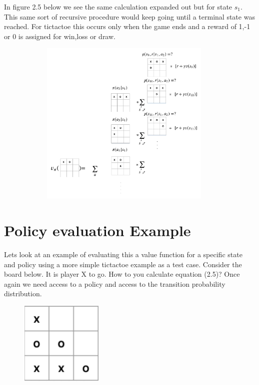 In figure 2.5 below we see the same calculation expanded out but for state $s_{1}$. This same sort of recursive procedure would keep going until a terminal state was reached. For tictactoe this occurs only when the game ends and a reward of 1,-1 or 0 is assigned for win,loss or draw. 

\begin{figure}[H]
        \centering
        \includegraphics[width=400px,height=300px]{images/PolicyEvaluationExample/intractable_value_function_2.png}
        \caption{}
        \label{fig:my_label}
\end{figure}

\section{Policy evaluation Example}

Lets look at an example of evaluating this a value function for a specific state and policy using a more simple tictactoe example as a test case. Consider the board below. It is player X to go. How to you calculate equation (2.5)? Once again we need access to a policy and access to the transition probability distribution. 

\begin{figure}[H]
        \centering
        \includegraphics[width=150px,height=150px]{images/PolicyEvaluationExample/pe_example_s0.png}
        \caption{}
        \label{fig:my_label}
\end{figure}

